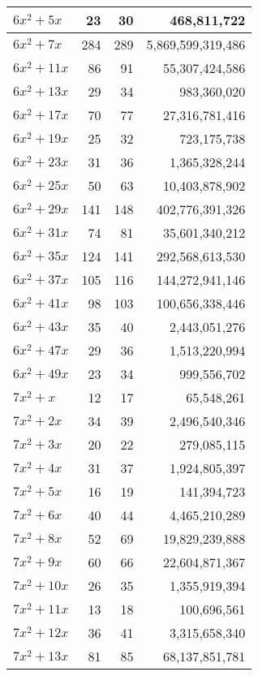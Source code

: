 \documentclass[a4paper]{amsproc}
\theoremstyle{plain}
\theoremstyle{named}
\begin{document}
\begin{longtable}{ | l | r | r | r | }
$6x^2 + 5x$ & 23 & 30 & 468{,}811{,}722 \\ \hline
$6x^2 + 7x$ & 284 & 289 & 5{,}869{,}599{,}319{,}486 \\ \hline
$6x^2 + 11x$ & 86 & 91 & 55{,}307{,}424{,}586 \\ \hline
$6x^2 + 13x$ & 29 & 34 & 983{,}360{,}020 \\ \hline
$6x^2 + 17x$ & 70 & 77 & 27{,}316{,}781{,}416 \\ \hline
$6x^2 + 19x$ & 25 & 32 & 723{,}175{,}738 \\ \hline
$6x^2 + 23x$ & 31 & 36 & 1{,}365{,}328{,}244 \\ \hline
$6x^2 + 25x$ & 50 & 63 & 10{,}403{,}878{,}902 \\ \hline
$6x^2 + 29x$ & 141 & 148 & 402{,}776{,}391{,}326 \\ \hline
$6x^2 + 31x$ & 74 & 81 & 35{,}601{,}340{,}212 \\ \hline
$6x^2 + 35x$ & 124 & 141 & 292{,}568{,}613{,}530 \\ \hline
$6x^2 + 37x$ & 105 & 116 & 144{,}272{,}941{,}146 \\ \hline
$6x^2 + 41x$ & 98 & 103 & 100{,}656{,}338{,}446 \\ \hline
$6x^2 + 43x$ & 35 & 40 & 2{,}443{,}051{,}276 \\ \hline
$6x^2 + 47x$ & 29 & 36 & 1{,}513{,}220{,}994 \\ \hline
$6x^2 + 49x$ & 23 & 34 & 999{,}556{,}702 \\ \hline
$7x^2 + x$ & 12 & 17 & 65{,}548{,}261 \\ \hline
$7x^2 + 2x$ & 34 & 39 & 2{,}496{,}540{,}346 \\ \hline
$7x^2 + 3x$ & 20 & 22 & 279{,}085{,}115 \\ \hline
$7x^2 + 4x$ & 31 & 37 & 1{,}924{,}805{,}397 \\ \hline
$7x^2 + 5x$ & 16 & 19 & 141{,}394{,}723 \\ \hline
$7x^2 + 6x$ & 40 & 44 & 4{,}465{,}210{,}289 \\ \hline
$7x^2 + 8x$ & 52 & 69 & 19{,}829{,}239{,}888 \\ \hline
$7x^2 + 9x$ & 60 & 66 & 22{,}604{,}871{,}367 \\ \hline
$7x^2 + 10x$ & 26 & 35 & 1{,}355{,}919{,}394 \\ \hline
$7x^2 + 11x$ & 13 & 18 & 100{,}696{,}561 \\ \hline
$7x^2 + 12x$ & 36 & 41 & 3{,}315{,}658{,}340 \\ \hline
$7x^2 + 13x$ & 81 & 85 & 68{,}137{,}851{,}781 \\ \hline

\end{longtable}
\end{document}
